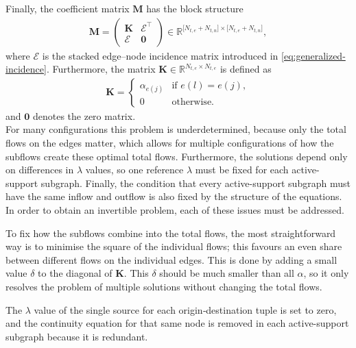 \documentclass[twocolumn,english,groupedaddress, superscriptaddress,aps,pre,10pt,floatfix]{revtex4-2}
\newcommand{\matr}[1]{{\boldsymbol{#1}}}
\begin{document}
Finally, the coefficient matrix $\matr{M}$ has the block structure
\begin{align}
\matr{M}=
\begin{pmatrix}
\matr{K}&\matr{\mathcal{E}}^{\!\top}\\
\matr{\mathcal{E}}&\matr{0}
\end{pmatrix}
\in\mathbb{R}^{\bigl[N_{t,e}+N_{t,n}\bigr]\times\bigl[N_{t,e}+N_{t,n}\bigr]},
\end{align}
where $\matr{\mathcal{E}}$ is the stacked edge–node incidence matrix introduced in \cref{eq:generalized-incidence}. Furthermore, the matrix $\matr{K}\in\mathbb{R}^{N_{t,e}\times N_{t,e}}$ is defined as
\begin{align}
\matr{K}=
\begin{cases}
\alpha_{e(j)} & \text{if }e(l)=e(j),\\[2pt]
0             & \text{otherwise.}
\end{cases}
\end{align}
and $\matr{0}$ denotes the zero matrix.\\

For many configurations this problem is underdetermined, because only the total flows on the edges matter, which allows for multiple configurations of how the subflows create these optimal total flows. Furthermore, the solutions depend only on differences in $\lambda$ values, so one reference $\lambda$ must be fixed for each active-support subgraph. Finally, the condition that every active-support subgraph must have the same inflow and outflow is also fixed by the structure of the equations. In order to obtain an invertible problem, each of these issues must be addressed.

To fix how the subflows combine into the total flows, the most straightforward way is to minimise the square of the individual flows; this favours an even share between different flows on the individual edges. This is done by adding a small value $\delta$ to the diagonal of $\matr{K}$. This $\delta$ should be much smaller than all $\alpha$, so it only resolves the problem of multiple solutions without changing the total flows.

The $\lambda$ value of the single source for each origin‑destination tuple is set to zero, and the continuity equation for that same node is removed in each active-support subgraph because it is redundant.
\end{document}
